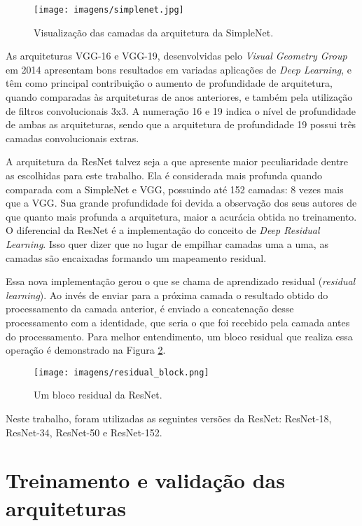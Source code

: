 \documentclass[
12pt,       %
openright,      %
oneside,      %
a4paper,      %
english,      %
french,       %
spanish,      %
brazil        %
]{abntex2}
\begin{document}
\begin{figure}[ht]
\centering
\caption{Visualização das camadas da arquitetura da SimpleNet.}
\texttt{[image: imagens/simplenet.jpg]}
\label{fig:simplenet}
\end{figure}

As arquiteturas VGG-16 e VGG-19, desenvolvidas pelo \textit{Visual Geometry Group} em 2014 apresentam bons resultados em variadas aplicações de \textit{Deep Learning}, e têm como principal contribuição o aumento de profundidade de arquitetura, quando comparadas às arquiteturas de anos anteriores, e também pela utilização de filtros convolucionais 3x3. A numeração 16 e 19 indica o nível de profundidade de ambas as arquiteturas, sendo que a arquitetura de profundidade 19 possui três camadas convolucionais extras.

A arquitetura da ResNet talvez seja a que apresente maior peculiaridade dentre as escolhidas para este trabalho. Ela é considerada mais profunda quando comparada com a SimpleNet e VGG, possuindo até 152 camadas: 8 vezes mais que a VGG. Sua grande profundidade foi devida a observação dos seus autores de que quanto mais profunda a arquitetura, maior a acurácia obtida no treinamento. O diferencial da ResNet é a implementação do conceito de \textit{Deep Residual Learning}. Isso quer dizer que no lugar de empilhar camadas uma a uma, as camadas são encaixadas formando um mapeamento residual.

Essa nova implementação gerou o que se chama de aprendizado residual (\textit{residual learning}). Ao invés de enviar para a próxima camada o resultado obtido do processamento da camada anterior, é enviado a concatenação desse processamento com a identidade, que seria o que foi recebido pela camada antes do processamento. Para melhor entendimento, um bloco residual que realiza essa operação é demonstrado na Figura \ref{fig:residual_block}.

\begin{figure}[ht]
\centering
\caption{Um bloco residual da ResNet.}
\texttt{[image: imagens/residual\_block.png]}
\label{fig:residual_block}
\end{figure}

Neste trabalho, foram utilizadas as seguintes versões da ResNet: ResNet-18, ResNet-34, ResNet-50 e ResNet-152.

\section{Treinamento e validação das arquiteturas} \label{treinamento-arquiteturas}
\end{document}

